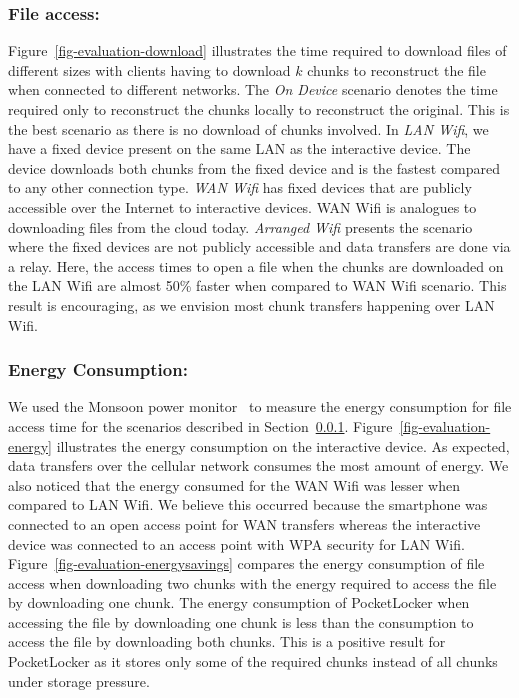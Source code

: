 \subsubsection{File access:\space} \label{sec-fileaccess}
Figure~\ref{fig-evaluation-download} illustrates the time required to
download files of different sizes with clients having to download $k$ chunks
to reconstruct the file when connected to different networks. The \textit{On
Device} scenario denotes the time required only to reconstruct the chunks
locally to reconstruct the original. This is the best scenario as there is no
download of chunks involved. In \textit{LAN Wifi}, we have a fixed device
present on the same LAN as the interactive device. The device downloads both
chunks from the fixed device and is the fastest compared to any other
connection type. \textit{WAN Wifi} has fixed devices that are publicly
accessible over the Internet to interactive devices. WAN Wifi is analogues to
downloading files from the cloud today. \textit{Arranged Wifi} presents the
scenario where the fixed devices are not publicly accessible and data
transfers are done via a relay. Here, the access times to open a file when
the chunks are downloaded on the LAN Wifi are almost 50\% faster when
compared to WAN Wifi scenario. This result is encouraging, as we envision
most chunk transfers happening over LAN Wifi.

\subsubsection{Energy Consumption:\space} We used the Monsoon power
monitor~\cite{monsoon} to measure the energy consumption for file access time
for the scenarios described in Section~\ref{sec-fileaccess}.
Figure~\ref{fig-evaluation-energy} illustrates the energy consumption on the
interactive device. As expected, data transfers over the cellular network
consumes the most amount of energy. We also noticed that the energy consumed
for the WAN Wifi was lesser when compared to LAN Wifi. We believe this
occurred because the smartphone was connected to an open access point for WAN
transfers whereas the interactive device was connected to an access point
with WPA security for LAN Wifi. Figure~\ref{fig-evaluation-energysavings}
compares the energy consumption of file access when downloading two chunks
with the energy required to access the file by downloading one chunk. The
energy consumption of PocketLocker when accessing the file by downloading one
chunk is less than the consumption to access the file by downloading both
chunks. This is a positive result for PocketLocker as it stores only some of
the required chunks instead of all chunks under storage pressure.
